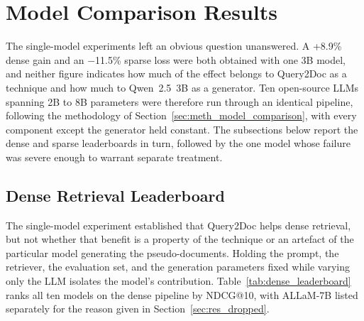 \section{Model Comparison Results}
\label{sec:res_model_comparison}

The single-model experiments left an obvious question unanswered. A +8.9\% dense gain and an $-$11.5\% sparse loss were both obtained with one 3B model, and neither figure indicates how much of the effect belongs to Query2Doc as a technique and how much to Qwen~2.5~3B as a generator. Ten open-source LLMs spanning 2B to 8B parameters were therefore run through an identical pipeline, following the methodology of Section~\ref{sec:meth_model_comparison}, with every component except the generator held constant. The subsections below report the dense and sparse leaderboards in turn, followed by the one model whose failure was severe enough to warrant separate treatment.

\subsection{Dense Retrieval Leaderboard}
\label{sec:res_mc_dense}

The single-model experiment established that Query2Doc helps dense retrieval, but not whether that benefit is a property of the technique or an artefact of the particular model generating the pseudo-documents. Holding the prompt, the retriever, the evaluation set, and the generation parameters fixed while varying only the LLM isolates the model's contribution. Table~\ref{tab:dense_leaderboard} ranks all ten models on the dense pipeline by NDCG@10, with ALLaM-7B listed separately for the reason given in Section~\ref{sec:res_dropped}.


